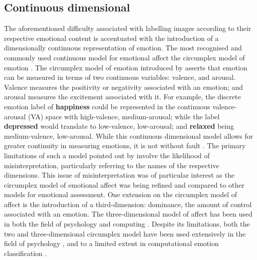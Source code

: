 \documentclass{article}
\begin{document}
\subsection{Continuous dimensional}

The aforementioned difficulty associated with labelling images according to their respective emotional content is accentuated with the introduction of a dimensionally continuous representation of emotion.
The most recognised and commonly used continuous model for emotional affect the circumplex model of emotion \citep{russell1980circumplex}.
The circumplex model of emotion introduced by \citet{russell1980circumplex} asserts that emotion can be measured in terms of two continuous variables: valence, and arousal.
Valence measures the positivity or negativity associated with an emotion; and arousal measures the excitement associated with it.
For example, the discrete emotion label of \textbf{happiness} could be represented in the continuous valence-arousal (VA) space with high-valence, medium-arousal; while the label \textbf{depressed} would translate to low-valence, low-arousal; and \textbf{relaxed} being medium-valence, low-arousal.
While this continuous dimensional model allows for greater continuity in measuring emotions, it is not without fault \citep{larsen1992promises}.
The primary limitations of such a model pointed out by \citet{larsen1992promises} involve the likelihood of misinterpretation, particularly referring to the names of the respective dimensions.
This issue of misinterpretation was of particular interest as the circumplex model of emotional affect was being refined and compared to other models for emotional assessment.
One extension on the circumplex model of affect is the introduction of a third-dimension: dominance, the amount of control associated with an emotion.
The three-dimensional model of affect has been used in both the field of psychology and computing \citep{warriner2013norms,zhao2016predicting}.
Despite its limitations, both the two and three-dimensional circumplex model have been used extensively in the field of psychology \citep{bradley1994measuring,warriner2013norms}, and to a limited extent in computational emotion classification \citep{zhao2016predicting}.
\end{document}
